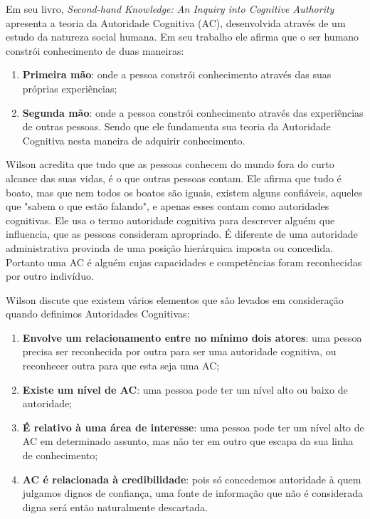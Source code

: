 Em seu livro, \emph{Second-hand Knowledge: An Inquiry into Cognitive Authority} \cite{Wilson1983} apresenta a teoria da Autoridade Cognitiva (AC), desenvolvida através de um estudo da natureza social humana. Em seu trabalho ele afirma que o ser humano constrói conhecimento de duas maneiras: 
\begin{enumerate}
    \item \textbf{Primeira mão}: onde a pessoa constrói conhecimento através das suas próprias experiências;
    \item \textbf{Segunda mão}: onde a pessoa constrói conhecimento através das experiências de outras pessoas. Sendo que ele fundamenta sua teoria da Autoridade Cognitiva nesta maneira de adquirir conhecimento. 
\end{enumerate}

Wilson acredita que tudo que as pessoas conhecem do mundo fora do curto alcance das suas vidas, é o que outras pessoas contam. Ele afirma que tudo é boato, mas que nem todos os boatos são iguais, existem alguns confiáveis, aqueles que "sabem o que estão falando", e apenas esses contam como autoridades cognitivas. Ele usa o termo autoridade cognitiva para descrever alguém que influencia, que as pessoas consideram apropriado. É diferente de uma autoridade administrativa provinda de uma posição hierárquica imposta ou concedida. Portanto uma AC é alguém cujas capacidades e competências foram reconhecidas por outro indivíduo.

Wilson discute que existem vários elementos que são levados em consideração quando definimos Autoridades Cognitivas:

\begin{enumerate}
    \item \textbf{Envolve um relacionamento entre no mínimo dois atores}: uma pessoa precisa ser reconhecida por outra para ser uma autoridade cognitiva, ou reconhecer outra para que esta seja uma AC;
    
    \item \textbf{Existe um nível de AC}: uma pessoa pode ter um nível alto ou baixo de autoridade;
    
    \item \textbf{É relativo à uma área de interesse}: uma pessoa pode ter um nível alto de AC em determinado assunto, mas não ter em outro que escapa da sua linha de conhecimento;
    
    \item \textbf{AC é relacionada à credibilidade}: pois só concedemos autoridade à quem julgamos dignos de confiança, uma fonte de informação que não é considerada digna será então naturalmente descartada.
\end{enumerate}

